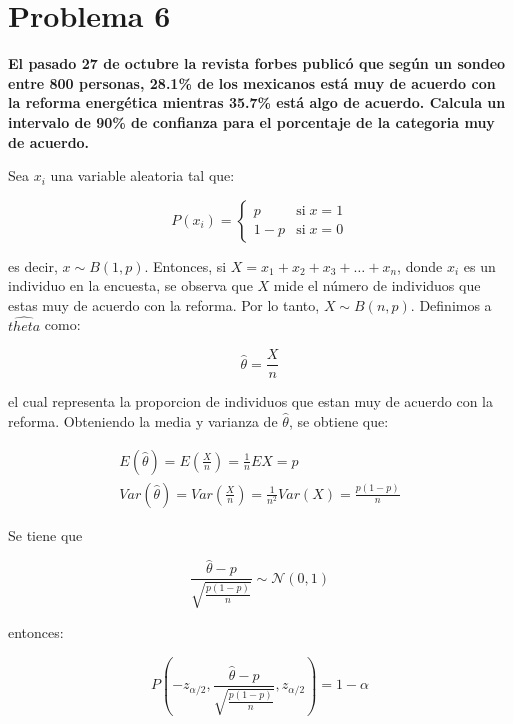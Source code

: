 \section*{Problema 6}

\textbf{El pasado 27 de octubre la revista forbes publicó que según un sondeo entre 800 personas, 28.1\% de los mexicanos está muy de acuerdo con la reforma energética mientras 35.7\% está algo de acuerdo. Calcula un intervalo de 90\% de confianza para el porcentaje de la categoria muy de acuerdo.}

Sea $x_i$ una variable aleatoria tal que:

\begin{equation*}
    P(x_i) = \begin{cases}
        p   & \text{si} \; x=1 \\
        1-p & \text{si} \; x=0
    \end{cases}
\end{equation*}

es decir, $x \sim B(1,p)$. Entonces, si $X=x_1 + x_2 +x_3 +\dots + x_n$, donde $x_i$ es un individuo en la encuesta, se observa que $X$ mide el número de individuos que estas muy de acuerdo con la reforma. Por lo tanto, $X \sim B(n,p)$. Definimos a $\hat{theta}$ como:

\begin{equation*}
    \hat{\theta} = \frac{X}{n}
\end{equation*}

el cual representa la proporcion de individuos que estan muy de acuerdo con la reforma. Obteniendo la media y varianza de $\hat{\theta}$, se obtiene que:

\begin{align*}
    E(\hat{\theta}) = E\left (\frac{X}{n}\right ) = \frac{1}{n} EX = p \\
    Var(\hat{\theta}) = Var \left (\frac{X}{n}\right ) = \frac{1}{n^2} Var(X) = \frac{p(1-p)}{n}
\end{align*}

Se tiene que

\begin{equation*}
    \frac{\hat{\theta}-p}{\sqrt{\frac{p(1-p)}{n}}} \sim \mathcal{N}(0,1)
\end{equation*}

entonces:

\begin{equation*}
    P\left (-z_{\alpha/2},\frac{\hat{\theta}-p}{\sqrt{\frac{p(1-p)}{n}}} , z_{\alpha/2}\right ) =1-\alpha
\end{equation*}

